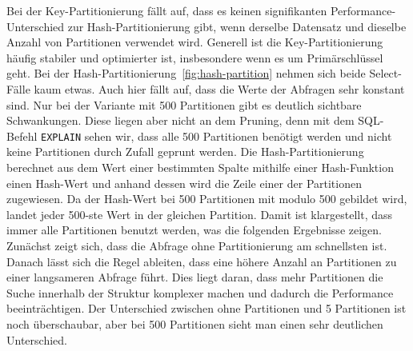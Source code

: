 Bei der Key-Partitionierung fällt auf, dass es keinen signifikanten Performance-Unterschied zur Hash-Partitionierung gibt, wenn derselbe Datensatz und dieselbe Anzahl von Partitionen verwendet wird.
Generell ist die Key-Partitionierung häufig stabiler und optimierter ist, insbesondere wenn es um Primärschlüssel geht.
Bei der Hash-Partitionierung~\ref{fig:hash-partition} nehmen sich beide Select-Fälle kaum etwas.
Auch hier fällt auf, dass die Werte der Abfragen sehr konstant sind.
Nur bei der Variante mit 500 Partitionen gibt es deutlich sichtbare Schwankungen.
Diese liegen aber nicht an dem Pruning, denn mit dem SQL-Befehl \texttt{EXPLAIN} sehen wir, dass alle 500 Partitionen benötigt werden und nicht keine Partitionen durch Zufall geprunt werden.
Die Hash-Partitionierung berechnet aus dem Wert einer bestimmten Spalte mithilfe einer Hash-Funktion einen Hash-Wert und anhand dessen wird die Zeile einer der Partitionen zugewiesen.
Da der Hash-Wert bei 500 Partitionen mit modulo 500 gebildet wird, landet jeder 500-ste Wert in der gleichen Partition.
Damit ist klargestellt, dass immer alle Partitionen benutzt werden, was die folgenden Ergebnisse zeigen.
Zunächst zeigt sich, dass die Abfrage ohne Partitionierung am schnellsten ist.
Danach lässt sich die Regel ableiten, dass eine höhere Anzahl an Partitionen zu einer langsameren Abfrage führt.
Dies liegt daran, dass mehr Partitionen die Suche innerhalb der Struktur komplexer machen und dadurch die Performance beeinträchtigen.
Der Unterschied zwischen ohne Partitionen und 5 Partitionen ist noch überschaubar, aber bei 500 Partitionen sieht man einen sehr deutlichen Unterschied.

